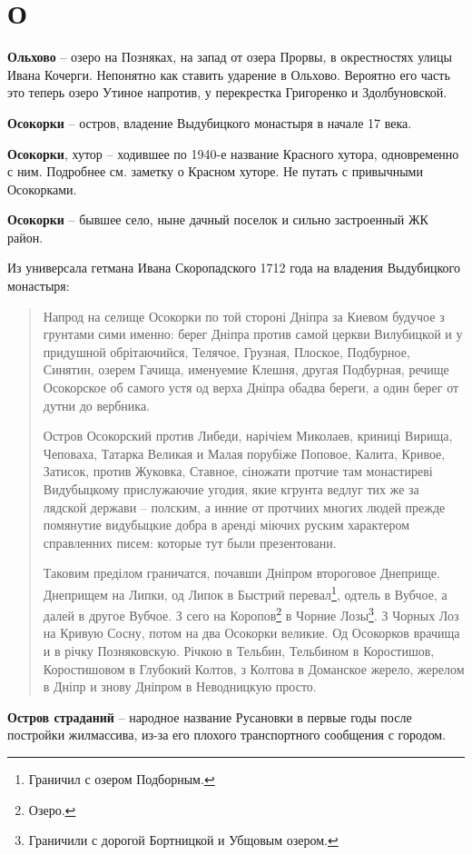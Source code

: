 \chapter*{О}

\textbf{Ольхово} – озеро на Позняках, на запад от озера Прорвы, в окрестностях улицы Ивана Кочерги. Непонятно как ставить ударение в Ольхово. Вероятно его часть это теперь озеро Утиное напротив, у перекрестка Григоренко и Здолбуновской.\\

\medskip


\textbf{Осокорки} – остров, владение Выдубицкого монастыря в начале 17 века.\\

\medskip

\textbf{Осокорки}, хутор – ходившее по 1940-е название Красного хутора, одновременно с ним. Подробнее см. заметку о Красном хуторе. Не путать с привычными Осокорками.\\

\medskip

\textbf{Осокорки} – бывшее село, ныне дачный поселок и сильно застроенный ЖК район.

Из универсала гетмана Ивана Скоропадского 1712 года на владения Выдубицкого монастыря:

\begin{quotation}
Напрод на селище Осокорки по той стороні Дніпра за Киевом будучое з грунтами сими именно: берег Дніпра против самой церкви Вилубицкой и у придушной обрітаючийся, Телячое, Грузная, Плоское, Подбурное, Синятин, озерем Гачища, именуемие Клешня, другая Подбурная, речище Осокорское об самого устя од верха Дніпра обадва береги, а один берег от дутни до вербника.

Остров Осокорский против Либеди, нарічіем Миколаев, криниці Вирища, Чеповаха, Татарка Великая и Малая порубіже Поповое, Калита, Кривое, Затисок, против Жуковка, Ставное, сіножати протчие там монастиреві Видубыцкому прислужаючие угодия, якие кгрунта ведлуг тих же за лядской держави – полским, а инние от протчиих многих людей прежде помянутие видубыцкие добра в аренді міючих руским характером справленних писем: которые тут были презентовани.

Таковим преділом граничатся, почавши Дніпром второговое Днеприще. Днеприщем на Липки, од Липок в Быстрий перевал\footnote{Граничил с озером Подборным.}, одтель в Вубчое, а далей в другое Вубчое. З сего на Коропов\footnote{Озеро.} в Чорние Лозы\footnote{Граничили с дорогой Бортницкой и Убщовым озером.}. З Чорных Лоз на Кривую Сосну, потом на два Осокорки великие. Од Осокорков врачища и в річку Позняковскую. Річкою в Тельбин, Тельбином в Коростишов, Коростишовом в Глубокий Колтов, з Колтова в Доманское жерело, жерелом в Дніпр и знову Дніпром в Неводницкую просто.
\end{quotation}

\medskip

\textbf{Остров страданий} – народное название Русановки в первые годы после постройки жилмассива, из-за его плохого транспортного сообщения с городом.

